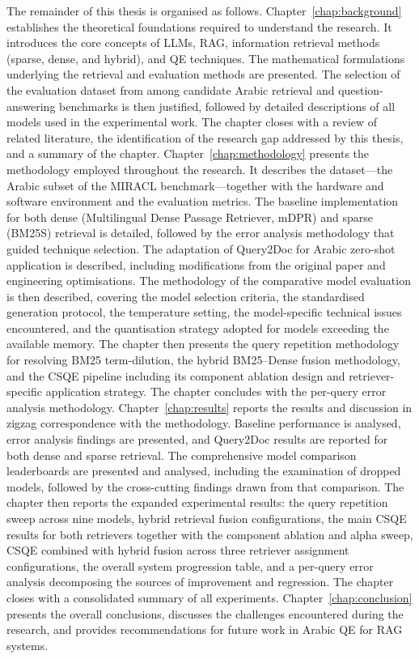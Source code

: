 The remainder of this thesis is organised as follows. Chapter~\ref{chap:background} establishes the theoretical foundations required to understand the research. It introduces the core concepts of LLMs, RAG, information retrieval methods (sparse, dense, and hybrid), and QE techniques. The mathematical formulations underlying the retrieval and evaluation methods are presented. The selection of the evaluation dataset from among candidate Arabic retrieval and question-answering benchmarks is then justified, followed by detailed descriptions of all models used in the experimental work. The chapter closes with a review of related literature, the identification of the research gap addressed by this thesis, and a summary of the chapter. Chapter~\ref{chap:methodology} presents the methodology employed throughout the research. It describes the dataset---the Arabic subset of the MIRACL benchmark---together with the hardware and software environment and the evaluation metrics. The baseline implementation for both dense (Multilingual Dense Passage Retriever, mDPR) and sparse (BM25S) retrieval is detailed, followed by the error analysis methodology that guided technique selection. The adaptation of Query2Doc for Arabic zero-shot application is described, including modifications from the original paper and engineering optimisations. The methodology of the comparative model evaluation is then described, covering the model selection criteria, the standardised generation protocol, the temperature setting, the model-specific technical issues encountered, and the quantisation strategy adopted for models exceeding the available memory. The chapter then presents the query repetition methodology for resolving BM25 term-dilution, the hybrid BM25--Dense fusion methodology, and the CSQE pipeline including its component ablation design and retriever-specific application strategy. The chapter concludes with the per-query error analysis methodology. Chapter~\ref{chap:results} reports the results and discussion in zigzag correspondence with the methodology. Baseline performance is analysed, error analysis findings are presented, and Query2Doc results are reported for both dense and sparse retrieval. The comprehensive model comparison leaderboards are presented and analysed, including the examination of dropped models, followed by the cross-cutting findings drawn from that comparison. The chapter then reports the expanded experimental results: the query repetition sweep across nine models, hybrid retrieval fusion configurations, the main CSQE results for both retrievers together with the component ablation and alpha sweep, CSQE combined with hybrid fusion across three retriever assignment configurations, the overall system progression table, and a per-query error analysis decomposing the sources of improvement and regression. The chapter closes with a consolidated summary of all experiments. Chapter~\ref{chap:conclusion} presents the overall conclusions, discusses the challenges encountered during the research, and provides recommendations for future work in Arabic QE for RAG systems.
